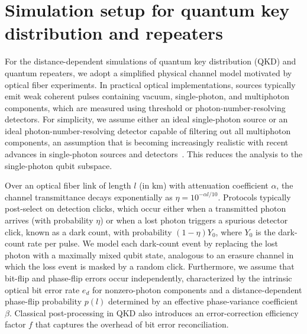 \documentclass[onecolumn,prx,longbibliography,nofootinbib, superscriptaddress]{revtex4-2}
\theoremstyle{recap}
\begin{document}
\section{Simulation setup for quantum key distribution and repeaters}\label{appendix:QKD}

For the distance-dependent simulations of quantum key distribution (QKD) and quantum repeaters, we adopt a simplified physical channel model motivated by optical fiber experiments. In practical optical implementations, sources typically emit weak coherent pulses containing vacuum, single-photon, and multiphoton components, which are measured using threshold or photon-number-resolving detectors. For simplicity, we assume either an ideal single-photon source or an ideal photon-number-resolving detector capable of filtering out all multiphoton components, an assumption that is becoming increasingly realistic with recent advances in single-photon sources and detectors~\cite{lu2023quantumdotsinglephotonsourcesquantum}. This reduces the analysis to the single-photon qubit subspace.

Over an optical fiber link of length $l$ (in $\mathrm{km}$) with attenuation coefficient $\alpha$, the channel transmittance decays exponentially as $\eta = 10^{-\alpha l/10}$. Protocols typically post-select on detection clicks, which occur either when a transmitted photon arrives (with probability $\eta$) or when a lost photon triggers a spurious detector click, known as a dark count, with probability $(1-\eta)Y_0$, where $Y_0$ is the dark-count rate per pulse. We model each dark-count event by replacing the lost photon with a maximally mixed qubit state, analogous to an erasure channel in which the loss event is masked by a random click. Furthermore, we assume that bit-flip and phase-flip errors occur independently, characterized by the intrinsic optical bit error rate $e_d$ for nonzero-photon components and a distance-dependent phase-flip probability $p(l)$ determined by an effective phase-variance coefficient $\beta$. Classical post-processing in QKD also introduces an error-correction efficiency factor $f$ that captures the overhead of bit error reconciliation.
\end{document}
